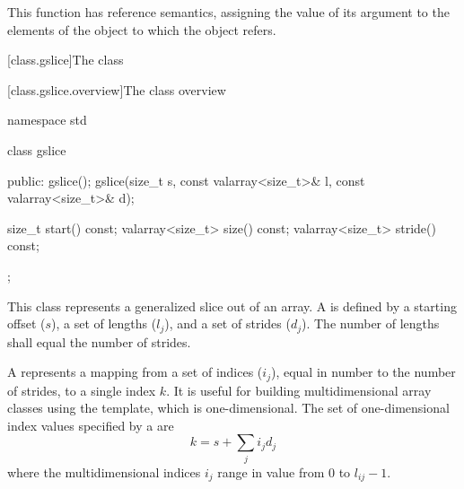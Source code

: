 \begin{itemdescr}
\pnum
This function has reference semantics, assigning the value of its argument
to the elements of the
object to which the
object refers.
\end{itemdescr}

[class.gslice]{The  class}

[class.gslice.overview]{The  class overview}

%
\begin{codeblock}
namespace std {
  class gslice {
  public:
    gslice();
    gslice(size_t s, const valarray<size_t>& l, const valarray<size_t>& d);

    size_t           start() const;
    valarray<size_t> size() const;
    valarray<size_t> stride() const;
  };
}
\end{codeblock}

\pnum
This class represents a generalized slice out of an array.
A
is defined by a starting offset ($s$),
a set of lengths ($l_j$),
and a set of strides ($d_j$).
The number of lengths shall equal the number of strides.

\pnum
A
represents a mapping from a set of indices ($i_j$),
equal in number to the number of strides, to a single index $k$.
It is useful for building multidimensional array classes using
the
template, which is one-dimensional.
The set of one-dimensional index values specified by a
are $$k = s + \sum_ji_jd_j$$
where the multidimensional indices $i_j$ range in value from
0 to $l_{ij} - 1$.

